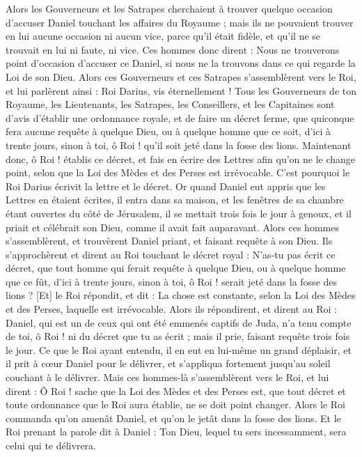 \begin{multicols}{2}
Alors les Gouverneurs et les Satrapes cherchaient à trouver quelque occasion d'accuser Daniel touchant les affaires du Royaume ; mais ils ne pouvaient trouver en lui aucune occasion ni aucun vice, parce qu'il était fidèle, et qu'il ne se trouvait en lui ni faute, ni vice.
Ces hommes donc dirent : Nous ne trouverons point d'occasion d'accuser ce Daniel, si nous ne la trouvons dans ce qui regarde la Loi de son Dieu.
Alors ces Gouverneurs et ces Satrapes s'assemblèrent vers le Roi, et lui parlèrent ainsi : Roi Darius, vis éternellement !
Tous les Gouverneurs de ton Royaume, les Lieutenants, les Satrapes, les Conseillers, et les Capitaines sont d'avis d'établir une ordonnance royale, et de faire un décret ferme, que quiconque fera aucune requête à quelque Dieu, ou à quelque homme que ce soit, d'ici à trente jours, sinon à toi, ô Roi ! qu'il soit jeté dans la fosse des lions.
Maintenant donc, ô Roi ! établis ce décret, et fais en écrire des Lettres afin qu'on ne le change point, selon que la Loi des Mèdes et des Perses est irrévocable.
C'est pourquoi le Roi Darius écrivit la lettre et le décret.
Or quand Daniel eut appris que les Lettres en étaient écrites, il entra dans sa maison, et les fenêtres de sa chambre étant ouvertes du côté de Jérusalem, il se mettait trois fois le jour à genoux, et il priait et célébrait son Dieu, comme il avait fait auparavant.
Alors ces hommes s'assemblèrent, et trouvèrent Daniel priant, et faisant requête à son Dieu.
Ils s'approchèrent et dirent au Roi touchant le décret royal : N'as-tu pas écrit ce décret, que tout homme qui ferait requête à quelque Dieu, ou à quelque homme que ce fût, d'ici à trente jours, sinon à toi, ô Roi ! serait jeté dans la fosse des lions ? [Et] le Roi répondit, et dit : La chose est constante, selon la Loi des Mèdes et des Perses, laquelle est irrévocable.
Alors ils répondirent, et dirent au Roi : Daniel, qui est un de ceux qui ont été emmenés captifs de Juda, n'a tenu compte de toi, ô Roi ! ni du décret que tu as écrit ; mais il prie, faisant requête trois fois le jour.
Ce que le Roi ayant entendu, il en eut en lui-même un grand déplaisir, et il prit à cœur Daniel pour le délivrer, et s'appliqua fortement jusqu'au soleil couchant à le délivrer.
Mais ces hommes-là s'assemblèrent vers le Roi, et lui dirent : Ô Roi ! sache que la Loi des Mèdes et des Perses est, que tout décret et toute ordonnance que le Roi aura établie, ne se doit point changer.
Alors le Roi commanda qu'on amenât Daniel, et qu'on le jetât dans la fosse des lions. Et le Roi prenant la parole dit à Daniel : Ton Dieu, lequel tu sers incessamment, sera celui qui te délivrera.

\end{multicols}
